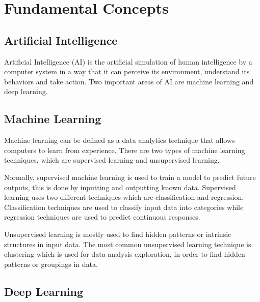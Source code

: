 \newpage


\section{Fundamental Concepts}
\label{sec:fundamental}
    \subsection{Artificial Intelligence}
    \par Artificial Intelligence (AI) is the artificial simulation of human intelligence by a computer system in a way that it can perceive its environment, understand its behaviors and take action. Two important areas of AI are machine learning and deep learning. \cite{mathworks_AI}

    \subsection{Machine Learning}



    \par Machine learning can be defined as a data analytics technique that allows computers to learn from experience. There are two types of machine learning techniques, which are supervised learning and unsupervised learning.
    \par Normally, supervised machine learning is used to train a model to predict future outputs, this is done by inputting and outputting known data. Supervised learning uses two different techniques which are classification and regression. Classification techniques are used to classify input data into categories while regression techniques are used to predict continuous responses. 
    \par Unsupervised learning is mostly used to find hidden patterns or intrinsic structures in input data. The most common unsupervised learning technique is clustering which is used for data analysis exploration, in order to find hidden patterns or groupings in data. \cite{mathworks_ML}

    \subsection{Deep Learning}


